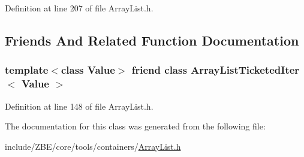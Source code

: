 Definition at line 207 of file Array\+List.\+h.



\subsection{Friends And Related Function Documentation}
\hypertarget{classzbe_1_1_array_list_ticketed_a57b86bbf01926226da6fa92bc31b0c5d}{}
\subsubsection[{Array\+List\+Ticketed\+Iter$<$ Value $>$}]{\setlength{\rightskip}{0pt plus 5cm}template$<$class Value$>$ friend class {\bf Array\+List\+Ticketed\+Iter}$<$ Value $>$\hspace{0.3cm}{\ttfamily [friend]}}\label{classzbe_1_1_array_list_ticketed_a57b86bbf01926226da6fa92bc31b0c5d}


Definition at line 148 of file Array\+List.\+h.



The documentation for this class was generated from the following file\+:\begin{DoxyCompactItemize}
\item 
include/\+Z\+B\+E/core/tools/containers/\hyperlink{_array_list_8h}{Array\+List.\+h}\end{DoxyCompactItemize}
